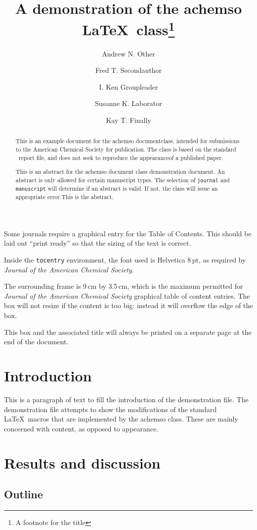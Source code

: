 \documentclass[journal=jacsat,manuscript=article]{achemso}
\author{Andrew N. Other}
\author{Fred T. Secondauthor}
\author{I. Ken Groupleader}
\affiliation{Department of Chemistry, Unknown University, Unknown Town}
\author{Susanne K. Laborator}
\affiliation{Lead Discovery, BigPharma, Big Town, USA}
\author{Kay T. Finally}
\affiliation{Department of Chemistry, Unknown University, Unknown Town}
\title[An \textsf{achemso} demo]{A demonstration of the \textsf{achemso}
\LaTeX~class\footnote{A footnote for the title}}
\begin{document}
\begin{abstract}
This is an example document for the \textsf{achemso} documentclass,
intended for submissions to the American Chemical Society for
publication. The class is based on the standard \LaTeXe~\textsf{report}
file, and does not seek to reproduce the appearanceof a published paper.

This is an abstract for the \textsf{achemso} document class
demonstration document. An abstract is only allowed for certain
manuscript types. The selection of \texttt{journal} and
\texttt{manuscript} will determine if an abstract is valid. If not, the
class will issue an appropriate error.This is the abstract.
\end{abstract}
\begin{tocentry}
Some journals require a graphical entry for the Table of Contents.
This should be laid out ``print ready'' so that the sizing of the
text is correct.

Inside the \texttt{tocentry} environment, the font used is Helvetica
8\,pt, as required by \emph{Journal of the American Chemical
Society}.

The surrounding frame is 9\,cm by 3.5\,cm, which is the maximum
permitted for  \emph{Journal of the American Chemical Society}
graphical table of content entries. The box will not resize if the
content is too big: instead it will overflow the edge of the box.

This box and the associated title will always be printed on a
separate page at the end of the document.
\end{tocentry}

\hypertarget{introduction}{%
\section{Introduction}\label{introduction}}

This is a paragraph of text to fill the introduction of the
demonstration file. The demonstration file attempts to show the
modifications of the standard \LaTeX~macros that are implemented by the
\textsf{achemso} class. These are mainly concerned with content, as
opposed to appearance.

\hypertarget{results-and-discussion}{%
\section{Results and discussion}\label{results-and-discussion}}

\hypertarget{outline}{%
\subsection{Outline}\label{outline}}
\end{document}
